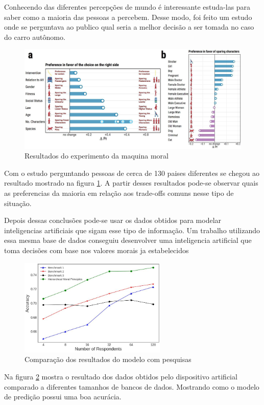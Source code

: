 Conhecendo das diferentes percepções de mundo é interessante estuda-las para saber como a maioria das pessoas a percebem. Desse modo, foi feito um estudo onde se perguntava ao publico qual seria a melhor decisão a ser tomada no caso do carro autônomo.

\begin{figure}[h!]
    \centering
    \includegraphics[width=15cm]{source/pictures/moral-machine.jpeg}
    \caption{Resultados do experimento da maquina moral \cite{Awad201859}}
    \label{fig:moral}
\end{figure}

Com o estudo perguntando pessoas de cerca de 130 paises diferentes se chegou ao resultado mostrado na figura \ref{fig:moral}. A partir desses resultados pode-se observar quais as preferencias da maioria em relação aos trade-offs comuns nesse tipo de situação.

Depois dessas conclusões pode-se usar os dados obtidos para modelar inteligencias artificiais que sigam esse tipo de informação. Um trabalho utilizando essa mesma base de dados conseguiu desenvolver uma inteligencia artificial que toma decisões com base nos valores morais ja estabelecidos

\begin{figure}[h!]
    \centering
    \includegraphics[width=7cm]{source/pictures/grapic.jpeg}
    \caption{Comparação dos resultados do modelo com pesquisas \cite{Kim2018197}}
    \label{fig:grapic}
\end{figure}

Na figura \ref{fig:grapic} mostra o resultado dos dados obtidos pelo dispositivo artificial comparado a diferentes tamanhos de bancos de dados. Mostrando como o modelo de predição possui uma boa acurácia.
